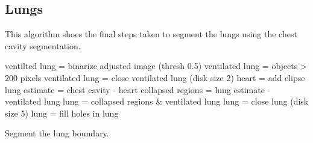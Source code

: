 \begin{appendices}
\section{Lungs}
This algorithm shoes the final steps taken to segment the lungs using the chest cavity 
segmentation.

\begin{algorithm}[H]
	\SetAlgoLined
		ventilted lung = binarize adjusted image (thresh 0.5) \;
		ventilated lung = objects > 200 pixels \;
		ventilated lung = close ventilated lung (disk size 2) \;
		heart = add elipse \;
		lung estimate = chest cavity - heart \;
		collapsed regions = lung estimate - ventilated lung \;
		lung = collapsed regions \& ventilated lung \;
		lung = close lung (disk size 5) \;
		lung = fill holes in lung \;
	\caption{Segment the lung boundary.}
\end{algorithm}

\end{appendices}